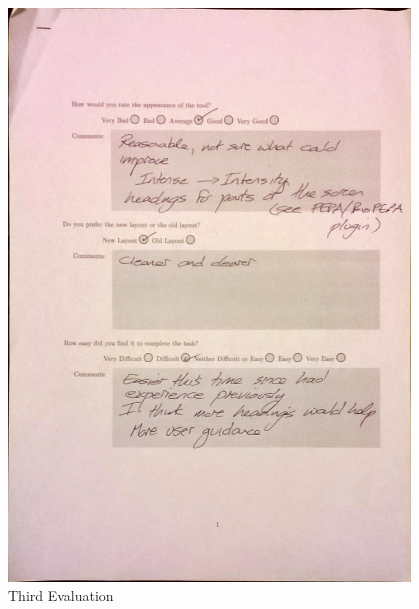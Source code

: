 \begin{figure}[h!]
    \centering
    \includegraphics[width=0.95\textwidth]{images/user_eval/user_eval_21.jpg}
    \caption{Third Evaluation}
\end{figure}


